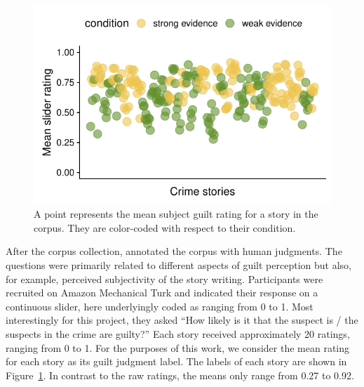 \documentclass[11pt,a4paper]{article}
\begin{document}

\begin{figure}[t!]
	\includegraphics[width=\linewidth]{graphs/subjguilt.pdf}
	\caption{A point represents the mean subject guilt rating for a story in the corpus. They are color-coded with respect to their condition.}
	\label{fig:corpus-annotations}
\end{figure}

After the corpus collection, \citeauthor{Kreiss:2019} annotated the corpus with human judgments. The questions were primarily related to different aspects of guilt perception but also, for example, perceived subjectivity of the story writing. Participants were recruited on Amazon Mechanical Turk and indicated their response on a continuous slider, here underlyingly coded as ranging from 0 to 1. Most interestingly for this project, they asked ``How likely is it that the suspect is / the suspects in the crime are guilty?'' Each story received approximately 20 ratings, ranging from 0 to 1. For the purposes of this work, we consider the mean rating for each story as its guilt judgment label. The labels of each story are shown in Figure~\ref{fig:corpus-annotations}. In contrast to the raw ratings, the means only range from 0.27 to 0.92. 

\end{document}

